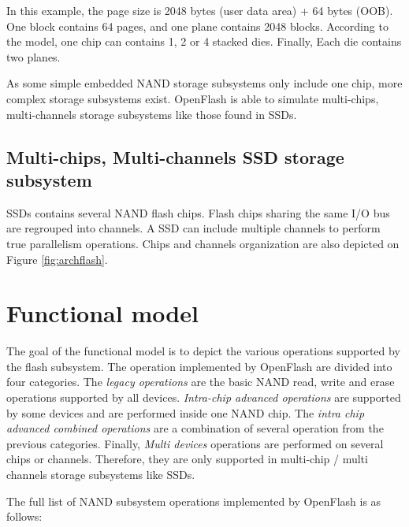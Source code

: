 In this example, the page size is 2048 bytes (user data area) + 64 bytes (OOB). One block contains 64 pages, and one plane contains 2048 blocks. According to the model, one chip can contains 1, 2 or 4 stacked dies. Finally, Each die contains two planes.

As some simple embedded NAND storage subsystems only include one chip, more complex storage subsystems exist. OpenFlash is able to simulate multi-chips, multi-channels storage subsystems like those found in SSDs.

\subsection{Multi-chips, Multi-channels SSD storage subsystem}

SSDs contains several NAND flash chips. Flash chips sharing the same I/O bus are regrouped into channels. A SSD can include multiple channels to perform true parallelism operations. Chips and channels organization are also depicted on Figure \ref{fig:archflash}.

  \section{Functional model}
  
The goal of the functional model is to depict the various operations supported by the flash subsystem. The operation implemented by OpenFlash are divided into four categories. The \emph{legacy operations} are the basic NAND read, write and erase operations supported by all devices. \emph{Intra-chip advanced operations} are supported by some devices and are performed inside one NAND chip. The \emph{intra chip advanced combined operations} are a combination of several operation from the previous categories. Finally, \emph{Multi devices} operations are performed on several chips or channels. Therefore, they are only supported in multi-chip / multi channels storage subsystems like SSDs.

The full list of NAND subsystem operations implemented by OpenFlash is as follows:

